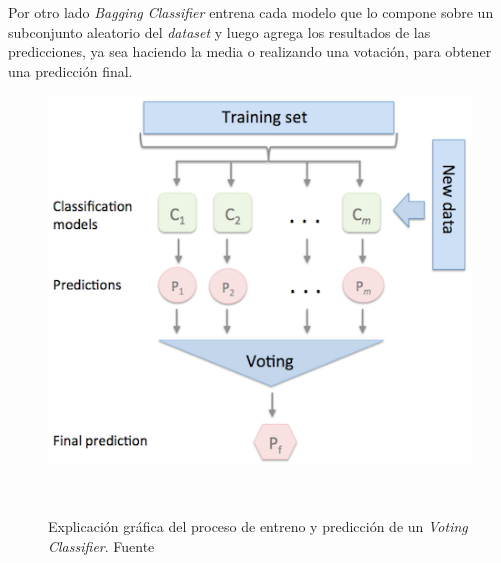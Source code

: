 Por otro lado \textit{Bagging Classifier} entrena cada modelo que lo compone sobre un subconjunto aleatorio del \textit{dataset} y luego agrega los resultados de las predicciones, ya sea haciendo la media o realizando una votación, para obtener una predicción final.

\begin{figure}[!h]
    \centering
    \includegraphics[width=0.7\linewidth]{media/images/majority_voting.png}
    \caption{Explicación gráfica del proceso de entreno y predicción de un \textit{Voting Classifier}. Fuente \cite{Ensemble96:online}}\ \label{fig:voting-classifiers}
\end{figure}